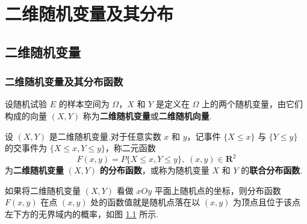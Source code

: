 \chapter{二维随机变量及其分布}

\section{二维随机变量}

\subsection{二维随机变量及其分布函数}

\begin{definition}
    设随机试验 $E$ 的样本空间为 $\varOmega$，$X$ 和 $Y$ 是定义在 $\varOmega$ 上的两个随机变量，由它们构成的向量 $(X,Y)$ 称为\textbf{二维随机变量}或\textbf{二维随机向量}.
\end{definition}

\begin{definition}
    设 $(X,Y)$ 是二维随机变量.对于任意实数 $x$ 和 $y$，记事件 $\{X \leqslant x\}$ 与 $\{Y \leqslant y\}$ 的交事件为 $\{X \leqslant x, Y \leqslant y\}$，称二元函数
    $$
    F(x, y) = P\{X \leqslant x, Y \leqslant y\}, \; (x,y) \in \mathbf{R}^2
    $$
    为\textbf{二维随机变量} $(X,Y)$ \textbf{的分布函数}，或称为随机变量 $X$ 和 $Y$ 的\textbf{联合分布函数}.
\end{definition}

如果将二维随机变量 $(X,Y)$ 看做 $xOy$ 平面上随机点的坐标，则分布函数 $F(x,y)$ 在点 $(x,y)$ 处的函数值就是随机点落在以 $(x,y)$ 为顶点且位于该点左下方的无界域内的概率，如图 \ref{fig:F(x,y)} 所示.

\begin{figure}[htbp]
    \centering


    \caption{}
    \label{fig:F(x,y)}
\end{figure}

